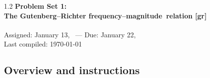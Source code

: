 \documentclass[11pt,titlepage,fleqn]{article}
\newcommand{\fmag}{frequency--magnitude}
\begin{document}

\begin{spacing}{1.2}
\centering
{\large \bf Problem Set 1: \\
The Gutenberg--Richter \fmag\ relation [gr]} \\
\cltag\ \\
Assigned: January 13, \cyear\ --- Due: January 22, \cyear\ \\
Last compiled: \today
\end{spacing}


\subsection*{Overview and instructions}
\end{document}
